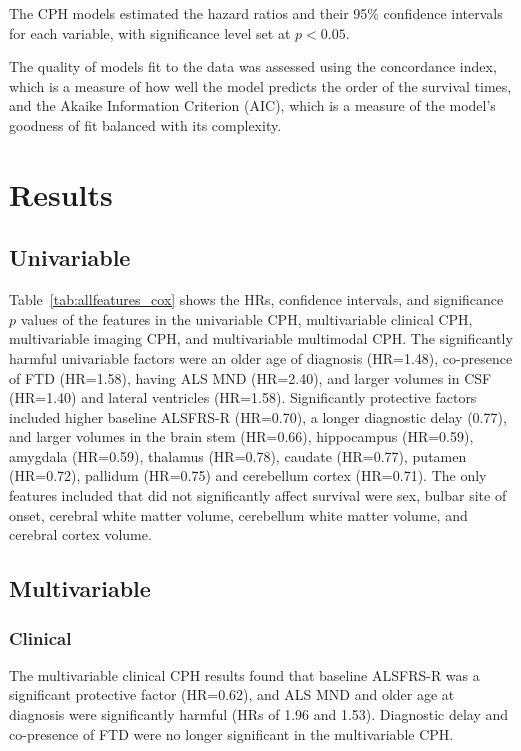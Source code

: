 The CPH models estimated the hazard ratios and their 95\% confidence intervals for each variable, with significance level set at $p<0.05$.

The quality of models fit to the data was assessed using the concordance index, which is a measure of how well the model predicts the order of the survival times, and the Akaike Information Criterion (AIC), which is a measure of the model's goodness of fit balanced with its complexity.

\section{Results}

\subsection{Univariable}



Table~\ref{tab:allfeatures_cox} shows the HRs, confidence intervals, and significance $p$ values of the features in the univariable CPH, multivariable clinical CPH, multivariable imaging CPH, and multivariable multimodal CPH.
The significantly harmful univariable factors were an older age of diagnosis (HR=1.48), co-presence of FTD (HR=1.58), having ALS MND (HR=2.40), and larger volumes in CSF (HR=1.40) and lateral ventricles (HR=1.58).
Significantly protective factors included higher baseline ALSFRS-R (HR=0.70), a longer diagnostic delay (0.77), and larger volumes in the brain stem (HR=0.66), hippocampus (HR=0.59), amygdala (HR=0.59), thalamus (HR=0.78), caudate (HR=0.77), putamen (HR=0.72), pallidum (HR=0.75) and cerebellum cortex (HR=0.71).
The only features included that did not significantly affect survival were sex, bulbar site of onset, cerebral white matter volume, cerebellum white matter volume, and cerebral cortex volume.


\subsection{Multivariable}

\subsubsection{Clinical}
The multivariable clinical CPH results found that baseline ALSFRS-R was a significant protective factor (HR=0.62), and ALS MND and older age at diagnosis were significantly harmful (HRs of 1.96 and 1.53).
Diagnostic delay and co-presence of FTD were no longer significant in the multivariable CPH.

